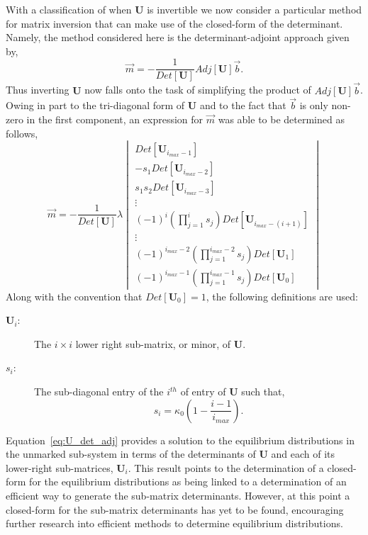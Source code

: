 \documentclass[review]{elsarticle}
\let\bs\boldsymbol
\begin{document}
With a classification of when $\bs{U}$ is invertible we now consider a particular method for matrix inversion that can make use of the closed-form of the determinant.
Namely, the method considered here is the determinant-adjoint approach given by,
\begin{equation*}
\vec{m}=-\frac{1}{Det[\bs{U}]}Adj[\bs{U}]\vec{b}.
\end{equation*}
Thus inverting $\bs{U}$ now falls onto the task of simplifying the product of $Adj[\bs{U}]\vec{b}$.
Owing in part to the tri-diagonal form of $\bs{U}$ and to the fact that $\vec{b}$ is only non-zero in the first component, an expression for $\vec{m}$ was able to be determined as follows,
\begin{equation}\label{eq:U_det_adj}
\vec{m}=-\frac{1}{Det[\bs{U}]}\lambda\begin{vmatrix}Det[\bs{U}_{i_{max}-1}]\\
-s_{1}Det[\bs{U}_{i_{max}-2}]\\
s_{1}s_{2}Det[\bs{U}_{i_{max}-3}]\\
\vdots\\
(-1)^{i}(\prod_{j=1}^{i}s_{j})Det[\bs{U}_{i_{max}-(i+1)}]\\
\vdots\\
(-1)^{i_{max}-2}(\prod_{j=1}^{i_{max}-2}s_{j})Det[\bs{U}_1]\\
(-1)^{i_{max}-1}(\prod_{j=1}^{i_{max}-1}s_{j})Det[\bs{U}_0]
\end{vmatrix}
\end{equation}
Along with the convention that $Det[\bs{U}_0]=1$, the following definitions are used:
\begin{description}
\item[{ $\bs{U}_{i}$:}] The $i\times i$ lower right sub-matrix, or minor, of $\bs{U}$.  
\item[{ $s_{i}$:}] The sub-diagonal entry of the $i^{th}$ of entry of $\bs{U}$ such that, \begin{equation*} s_{i}=\kappa_0\left(1-\frac{i-1}{i_{max}}\right). \end{equation*}
\end{description}
Equation~\ref{eq:U_det_adj} provides a solution to the equilibrium distributions in the unmarked sub-system in terms of the determinants of $\bs{U}$ and each of its lower-right sub-matrices, $\bs{U}_i$.
This result points to the determination of a closed-form for the equilibrium distributions as being linked to a determination of an efficient way to generate the sub-matrix determinants.
However, at this point a closed-form for the sub-matrix determinants has yet to be found, encouraging further research into efficient methods to determine equilibrium distributions.
\end{document}
